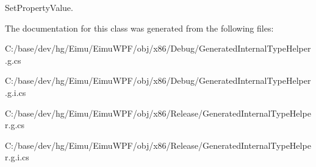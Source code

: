 SetPropertyValue. 



The documentation for this class was generated from the following files:\begin{DoxyCompactItemize}
\item 
C:/base/dev/hg/Eimu/EimuWPF/obj/x86/Debug/GeneratedInternalTypeHelper.g.cs\item 
C:/base/dev/hg/Eimu/EimuWPF/obj/x86/Debug/GeneratedInternalTypeHelper.g.i.cs\item 
C:/base/dev/hg/Eimu/EimuWPF/obj/x86/Release/GeneratedInternalTypeHelper.g.cs\item 
C:/base/dev/hg/Eimu/EimuWPF/obj/x86/Release/GeneratedInternalTypeHelper.g.i.cs\end{DoxyCompactItemize}
